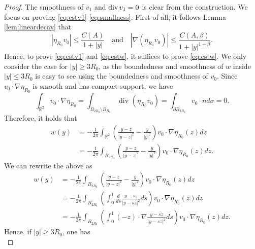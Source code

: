\documentclass[12pt]{amsart}
\renewcommand{\div}{{\rm div \thinspace }}
\numberwithin{equation}{section}              %
\theoremstyle{remark}
\begin{document}
		\begin{proof}
        The smoothness of $v_1$ and $\div v_1=0$ is clear from the construction. We  focus on proving \eqref{eq:estv1}-\eqref{eq:smallness}.
			First of all, it follows Lemma \ref{lem:lineardecay} that
			\begin{equation*}
				| \eta_{R_0}	 v_0|\leq \frac{C(A)}{1+|y|} \quad \text{and} \quad 	| \nabla (\eta_{R_0}	 v_0)|\leq \frac{C(A,\beta)}{1+|y|^{1+\beta}}.
			\end{equation*} 		
			Hence, to prove \eqref{eq:estv1} and \eqref{eq:estw}, it suffices to prove \eqref{eq:estw}. We only  consider the case for $|y|\geq 3R_0$, as the boundedness and smoothness of $w$ inside $|y|\leq 3R_0$ is easy to see using the boundedness and smoothness of $v_0$.
			Since 
			$v_0 \cdot \nabla  \eta_{R_0}$ is smooth and has compact support, we have
			\begin{equation*}
				\int_{\mathbb{R}^2} v_0 \cdot \nabla  \eta_{R_0} = \int_{B_{2R_0}\setminus B_{R_0}} \textrm{ div } (\eta_{R_0} v_0) =  \int_{\partial B_{2R_0}}  v_0\cdot n d\sigma=0.
			\end{equation*}
		Therefore, it holds that
			\begin{equation*}
				\begin{aligned}
					w(y) &=    -\frac{1}{2\pi} \int_{\mathbb{R}^2} \left(  \frac{y-z}{|y-z|^2} - \frac{y}{|y|^2}  \right) v_0 \cdot \nabla  \eta_{R_0}(z) dz\\
					&=-\frac{1}{2\pi} \int_{B_{2R_0}} \left(  \frac{y-z}{|y-z|^2} - \frac{y}{|y|^2}  \right) v_0 \cdot \nabla  \eta_{R_0}(z) dz.
				\end{aligned}	
			\end{equation*}
			We can rewrite the above as
			\begin{equation*}
				\begin{aligned}
					w(y) & = -\frac{1}{2\pi} \int_{B_{2R_0}} \left(  \frac{y-z}{|y-z|^2} - \frac{y}{|y|^2}  \right) v_0 \cdot \nabla  \eta_{R_0}(z) dz \\
					&= -\frac{1}{2\pi} \int_{B_{2R_0}} \left(\int_{0}^{1} \frac{d}{ds}\frac{y-sz}{|y-sz|^2} ds\right) v_0 \cdot \nabla  \eta_{R_0}(z) dz \\
					&= -\frac{1}{2\pi} \int_{B_{2R_0}}  \left(  \int_{0}^{1}(-z) \cdot \nabla \frac{y-sz}{|y-sz|^2} ds \right) v_0 \cdot \nabla  \eta_{R_0}(z) dz.
				\end{aligned}
			\end{equation*}
			Hence, if $|y|\geq 3R_0$, one has
			\begin{equation*}

\end{equation*}
\end{proof}
\end{document}
